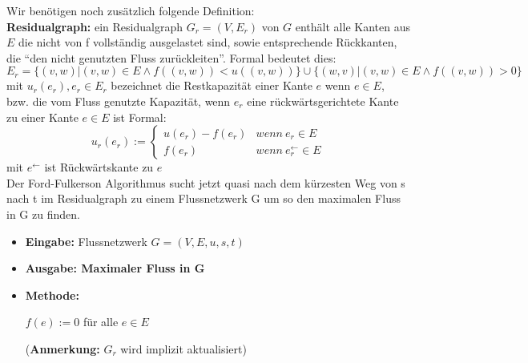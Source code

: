 \documentclass[10pt,a4paper]{article}
\begin{document}
Wir benötigen noch zusätzlich folgende Definition:
\\ \textbf{Residualgraph: } ein Residualgraph $G_r = (V, E_r)$ von $G$ enthält alle
    Kanten aus $E$ die nicht von f vollständig ausgelastet sind, sowie entsprechende Rückkanten,
    die ``den nicht genutzten Fluss zurückleiten''. Formal bedeutet dies:
    $$
        E_r = \{(v,w) | (v,w) \in E \wedge f((v,w)) < u((v,w))\} \cup \{ (w,v) | (v,w) \in E  \wedge f((v,w)) > 0  \}
    $$
    mit $u_r(e_r), e_r \in E_r$ bezeichnet die Restkapazität einer Kante $e$ wenn $e \in E$,
    bzw. die vom Fluss genutzte Kapazität, wenn $e_r$ eine rückwärtsgerichtete
    Kante zu einer Kante $e \in E$ ist
    Formal:
    $$
        u_r(e_r) :=  \begin{cases}
                            u(e_r ) - f(e_r)  & wenn \: e_r \in E \\
                            f(e_r) & wenn \: e_r^{\leftarrow} \in E
                          \end{cases} 
    $$
    mit $e^{\leftarrow}$ ist Rückwärtskante zu $e$ \\
    
    Der Ford-Fulkerson Algorithmus sucht jetzt quasi nach dem kürzesten Weg
    von s nach t im Residualgraph zu einem Flussnetzwerk G um so 
    den maximalen Fluss in G zu finden.
    \begin{itemize}
        \item \textbf{Eingabe: } Flussnetzwerk $G = (V,E, u,s,t)$
        \item \textbf{Ausgabe: Maximaler Fluss in G} 
        \item \textbf{Methode: } \\
            \begin{algorithm}[H]
                $f(e) := 0$ für alle $e \in E$\;
            \end{algorithm}
           (\textbf{Anmerkung:} $G_r$ wird implizit aktualisiert)


    \end{itemize}
    
\end{document}
